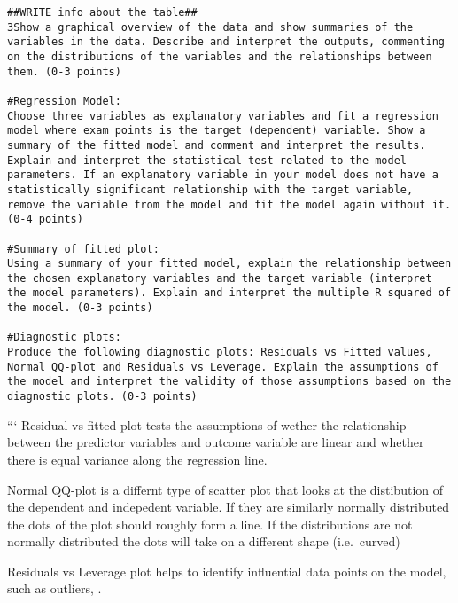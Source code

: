 \documentclass[]{article}
\begin{document}
\begin{verbatim}
##WRITE info about the table##
3Show a graphical overview of the data and show summaries of the variables in the data. Describe and interpret the outputs, commenting on the distributions of the variables and the relationships between them. (0-3 points)

#Regression Model:
Choose three variables as explanatory variables and fit a regression model where exam points is the target (dependent) variable. Show a summary of the fitted model and comment and interpret the results. Explain and interpret the statistical test related to the model parameters. If an explanatory variable in your model does not have a statistically significant relationship with the target variable, remove the variable from the model and fit the model again without it. (0-4 points)

#Summary of fitted plot:
Using a summary of your fitted model, explain the relationship between the chosen explanatory variables and the target variable (interpret the model parameters). Explain and interpret the multiple R squared of the model. (0-3 points)

#Diagnostic plots:
Produce the following diagnostic plots: Residuals vs Fitted values, Normal QQ-plot and Residuals vs Leverage. Explain the assumptions of the model and interpret the validity of those assumptions based on the diagnostic plots. (0-3 points)
\end{verbatim}

``` Residual vs fitted plot tests the assumptions of wether the
relationship between the predictor variables and outcome variable are
linear and whether there is equal variance along the regression line.

Normal QQ-plot is a differnt type of scatter plot that looks at the
distibution of the dependent and indepedent variable. If they are
similarly normally distributed the dots of the plot should roughly form
a line. If the distributions are not normally distributed the dots will
take on a different shape (i.e.~curved)

Residuals vs Leverage plot helps to identify influential data points on
the model, such as outliers, .
\end{document}
